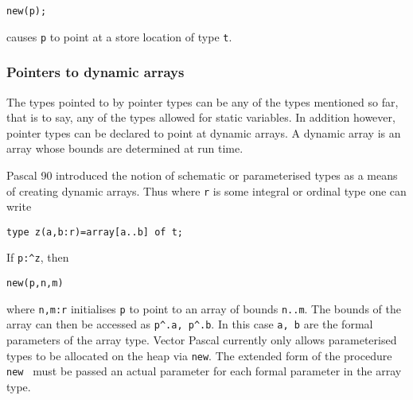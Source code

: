 \texttt{new(p);}

causes \texttt{p} to point at a store location of type \texttt{t}.


\subsubsection{Pointers to dynamic arrays}

The types pointed to by pointer types can be any of the types mentioned so far,
that is to say, any of the types allowed for static variables.
In addition however, pointer types can be declared to point at dynamic arrays.
A dynamic array is an array whose bounds are determined at run time.

Pascal 90\cite{ISO90} introduced the notion of schematic or
parameterised types as a means of creating dynamic arrays. Thus where \texttt{r}
is some integral or ordinal type one can write 

\texttt{type z(a,b:r)=array{[}a..b{]} of t;}

If \texttt{p:\textasciicircum{}z}, then 

\texttt{new(p,n,m)}

where \texttt{n,m:r} initialises \texttt{p} to point to an array of bounds \texttt{n..m}.
The bounds of the array can then be accessed as \texttt{p\textasciicircum{}.a,
p\textasciicircum{}.b}. In this case {\tt a, b} are the formal parameters of
the array type. Vector Pascal currently only allows  
parameterised types to be allocated on the heap via {\tt new}. The extended form of the procedure {\tt new } must be passed an actual
parameter for each formal parameter in the array type.

